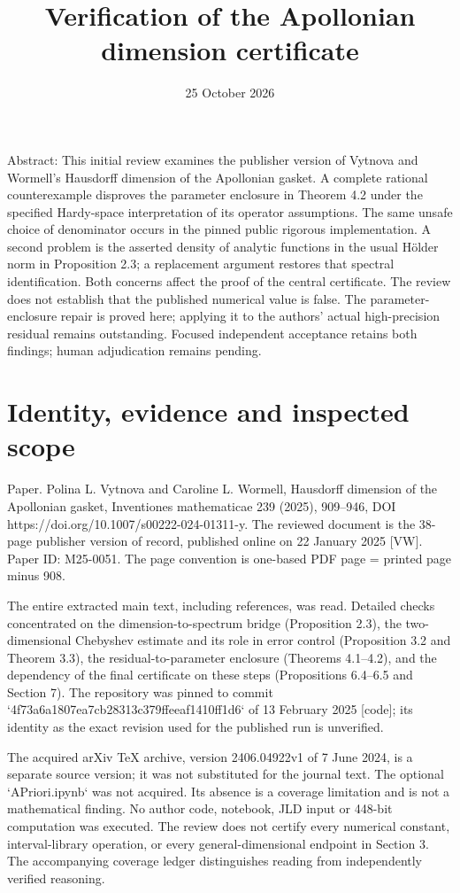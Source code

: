 \documentclass[10pt]{article}
\title{Verification of the Apollonian dimension certificate}
\author{}
\date{25 October 2026}
\begin{document}
\maketitle
Abstract: This initial review examines the publisher version of Vytnova and Wormell’s Hausdorff dimension of the Apollonian gasket. A complete rational counterexample disproves the parameter enclosure in Theorem 4.2 under the specified Hardy-space interpretation of its operator assumptions. The same unsafe choice of denominator occurs in the pinned public rigorous implementation. A second problem is the asserted density of analytic functions in the usual Hölder norm in Proposition 2.3; a replacement argument restores that spectral identification. Both concerns affect the proof of the central certificate. The review does not establish that the published numerical value is false. The parameter-enclosure repair is proved here; applying it to the authors’ actual high-precision residual remains outstanding. Focused independent acceptance retains both findings; human adjudication remains pending.\par
\section*{Identity, evidence and inspected scope}
Paper. Polina L. Vytnova and Caroline L. Wormell, Hausdorff dimension of the Apollonian gasket, Inventiones mathematicae 239 (2025), 909–946, DOI https://doi.org/10.1007/s00222-024-01311-y. The reviewed document is the 38-page publisher version of record, published online on 22 January 2025 [VW]. Paper ID: M25-0051. The page convention is one-based PDF page = printed page minus 908.\par
The entire extracted main text, including references, was read. Detailed checks concentrated on the dimension-to-spectrum bridge (Proposition 2.3), the two-dimensional Chebyshev estimate and its role in error control (Proposition 3.2 and Theorem 3.3), the residual-to-parameter enclosure (Theorems 4.1–4.2), and the dependency of the final certificate on these steps (Propositions 6.4–6.5 and Section 7). The repository was pinned to commit `4f73a6a1807ea7cb28313c379ffeeaf1410ff1d6` of 13 February 2025 [code]; its identity as the exact revision used for the published run is unverified.\par
The acquired arXiv TeX archive, version 2406.04922v1 of 7 June 2024, is a separate source version; it was not substituted for the journal text. The optional `APriori.ipynb` was not acquired. Its absence is a coverage limitation and is not a mathematical finding. No author code, notebook, JLD input or 448-bit computation was executed. The review does not certify every numerical constant, interval-library operation, or every general-dimensional endpoint in Section 3. The accompanying coverage ledger distinguishes reading from independently verified reasoning.\par
\end{document}
